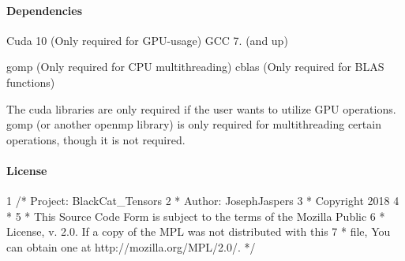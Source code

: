 \paragraph*{Dependencies}

Cuda 10 (Only required for G\+P\+U-\/usage) G\+CC 7. (and up)

gomp (Only required for C\+PU multithreading) cblas (Only required for B\+L\+AS functions)

The cuda libraries are only required if the user wants to utilize G\+PU operations. gomp (or another openmp library) is only required for multithreading certain operations, though it is not required.

\paragraph*{License}


\begin{DoxyCode}
1 /*  Project: BlackCat\_Tensors
2  *  Author: JosephJaspers
3  *  Copyright 2018
4  *
5  * This Source Code Form is subject to the terms of the Mozilla Public
6  * License, v. 2.0. If a copy of the MPL was not distributed with this
7  * file, You can obtain one at http://mozilla.org/MPL/2.0/. */
\end{DoxyCode}
 
